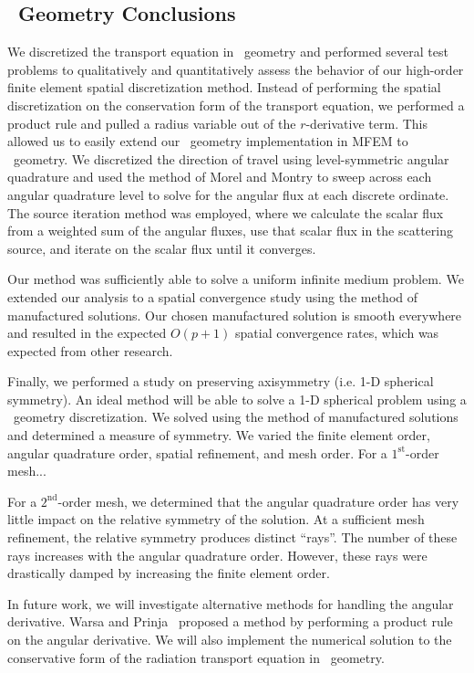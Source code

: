 \documentclass[12pt]{article}
\begin{document}
\subsection{\RZ\ Geometry Conclusions}
\label{sec:RZConclusions}
We discretized the transport equation in \RZ\ geometry and performed several test problems to qualitatively and quantitatively assess the behavior of our high-order finite element spatial discretization method. Instead of performing the spatial discretization on the conservation form of the transport equation, we performed a product rule and pulled a radius variable out of the $r$-derivative term. This allowed us to easily extend our \XY\ geometry implementation in MFEM to \RZ\ geometry. We discretized the direction of travel using level-symmetric angular quadrature and used the method of Morel and Montry to sweep across each angular quadrature level to solve for the angular flux at each discrete ordinate. The source iteration method was employed, where we calculate the scalar flux from a weighted sum of the angular fluxes, use that scalar flux in the scattering source, and iterate on the scalar flux until it converges.

Our method was sufficiently able to solve a uniform infinite medium problem. We extended our analysis to a spatial convergence study using the method of manufactured solutions. Our chosen manufactured solution is smooth everywhere and resulted in the expected $O(p+1)$ spatial convergence rates, which was expected from other research.

Finally, we performed a study on preserving axisymmetry (i.e. 1-D spherical symmetry). An ideal method will be able to solve a 1-D spherical problem using a \RZ\ geometry discretization. We solved using the method of manufactured solutions and determined a measure of symmetry. We varied the finite element order, angular quadrature order, spatial refinement, and mesh order.
{\color{blue}For a $1^\text{st}$-order mesh...}

For a $2^\text{nd}$-order mesh, we determined that the angular quadrature order has very little impact on the relative symmetry of the solution. At a sufficient mesh refinement, the relative symmetry produces distinct ``rays''. The number of these rays increases with the angular quadrature order. However, these rays were drastically damped by increasing the finite element order.

In future work, we will investigate alternative methods for handling the angular derivative. Warsa and Prinja~\cite{WarsaAngularQuadrature} proposed a method by performing a product rule on the angular derivative. We will also implement the numerical solution to the conservative form of the radiation transport equation in \RZ\ geometry.
\end{document}
